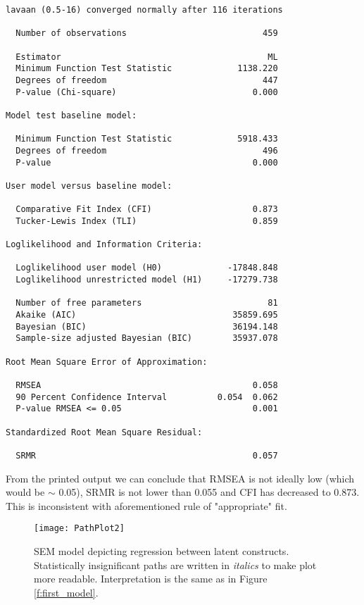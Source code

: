 \documentclass[10pt,a4paper]{article}
\begin{document}
\begin{verbatim}
lavaan (0.5-16) converged normally after 116 iterations

  Number of observations                           459

  Estimator                                         ML
  Minimum Function Test Statistic             1138.220
  Degrees of freedom                               447
  P-value (Chi-square)                           0.000

Model test baseline model:

  Minimum Function Test Statistic             5918.433
  Degrees of freedom                               496
  P-value                                        0.000

User model versus baseline model:

  Comparative Fit Index (CFI)                    0.873
  Tucker-Lewis Index (TLI)                       0.859

Loglikelihood and Information Criteria:

  Loglikelihood user model (H0)             -17848.848
  Loglikelihood unrestricted model (H1)     -17279.738

  Number of free parameters                         81
  Akaike (AIC)                               35859.695
  Bayesian (BIC)                             36194.148
  Sample-size adjusted Bayesian (BIC)        35937.078

Root Mean Square Error of Approximation:

  RMSEA                                          0.058
  90 Percent Confidence Interval          0.054  0.062
  P-value RMSEA <= 0.05                          0.001

Standardized Root Mean Square Residual:

  SRMR                                           0.057
\end{verbatim}

From the printed output we can conclude that RMSEA is not ideally low (which would be $\sim$ 0.05), SRMR is not lower than 0.055 and CFI has decreased to 0.873. This is inconsistent with aforementioned rule of "appropriate" fit.


\begin{figure}[ht]
\texttt{[image: PathPlot2]}
\caption{SEM model depicting regression between latent constructs. Statistically insignificant paths are written in \emph{italics} to make plot more readable. Interpretation is the same as in Figure \ref{f:first_model}.}
\end{figure}
\end{document}
